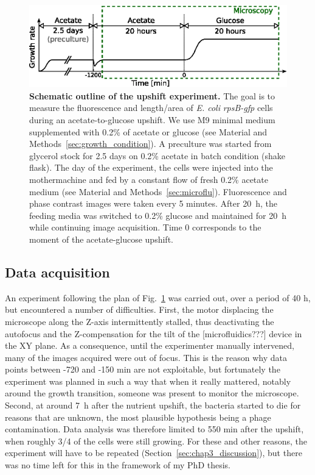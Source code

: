 \begin{figure}[tb]
\centering
\includegraphics[scale=1]{./Fig/experiment_schema.eps}
\caption{
\textbf{Schematic outline of the upshift experiment.}
The goal is to measure the fluorescence and length/area of \textit{E. coli} \textit{rpsB-gfp} cells during an acetate-to-glucose upshift.
We use M9 minimal medium supplemented with 0.2\% of acetate or glucose (see Material and Methods~\ref{sec:growth_condition}).
A preculture was started from glycerol stock for 2.5 days on 0.2\% acetate in batch condition (shake flask).
The day of the experiment, the cells were injected into the mothermachine and fed by a constant flow of fresh 0.2\% acetate medium (see Material and Methods~\ref{sec:microflu}).
Fluorescence and phase contrast images were taken every 5 minutes.
After 20~h, the feeding media was switched to 0.2\% glucose and maintained for 20~h while continuing image acquisition.
Time 0 corresponds to the moment of the acetate-glucose upshift.
}
\label{fig:experiment_schema}
\end{figure}

\subsection{Data acquisition}
\label{sec:data_acquisition}

An experiment following the plan of Fig.~\ref{fig:experiment_schema} was carried out, over a period of 40 h, but encountered a number of difficulties.
First, the motor displacing the microscope along the Z-axis intermittently stalled, thus deactivating the autofocus and the Z-compensation for the tilt of the [microfluidics???] device in the XY plane.
As a consequence, until the experimenter manually intervened, many of the images acquired were out of focus.
This is the reason why data points between -720 and -150 min are not exploitable, but fortunately the experiment was planned in such a way that when it really mattered, notably around the growth transition, someone was present to monitor the microscope.
Second, at around 7~h after the nutrient upshift, the bacteria started to die for reasons that are unknown, the most plausible hypothesis being a phage contamination.
Data analysis was therefore limited to 550 min after the upshift, when roughly 3/4 of the cells were still growing.
For these and other reasons, the experiment will have to be repeated (Section~\ref{sec:chap3_discussion}), but there was no time left for this in the framework of my PhD thesis.

